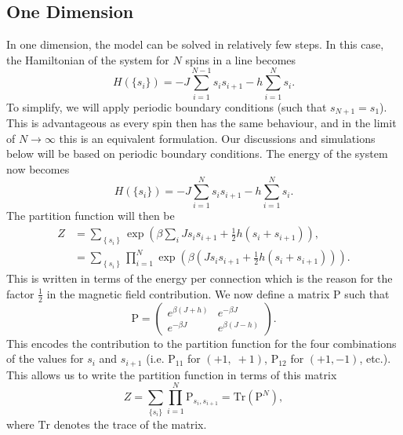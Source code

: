 \documentclass[11pt]{article}
\newcommand{\bmat}[1]{\bm{\mathrm{#1}}}
\begin{document}
	\subsection{One Dimension}
	
	In one dimension, the model can be solved in relatively few steps. In this case, the Hamiltonian of the system for $N$ spins in a line becomes
	\begin{equation}
		H(\{s_i\}) = -J \sum_{i=1}^{N-1} s_i s_{i+1} -h\sum_{i=1}^N s_i.
	\end{equation}
	To simplify, we will apply periodic boundary conditions (such that $s_{N+1} = s_1$). This is advantageous as every spin then has the same behaviour, and in the limit of $N \to \infty$ this is an equivalent formulation. Our discussions and simulations below will be based on periodic boundary conditions. The energy of the system now becomes
	\begin{equation} \label{eq:Energy1D}
		H(\{s_i\}) = -J \sum_{i=1}^{N} s_i s_{i+1} -h\sum_{i=1}^N s_i.
	\end{equation}
	The partition function will then be
	\begin{equation}
		\begin{split}
			Z &= \sum_{\left\{s_i\right\}} \exp{\left(\beta \sum_i Js_is_{i+1} + \frac12 h(s_i + s_{i+1})\right)}, \\
			&= \sum_{\left\{s_i\right\}} \prod_{i=1}^N \exp{\left(\beta \left(Js_is_{i+1} + \frac12 h(s_i + s_{i+1})\right)\right)}.
		\end{split}
	\end{equation}
	This is written in terms of the energy per connection which is the reason for the factor $\frac12$ in the magnetic field contribution. We now define a matrix $\bmat{P}$ such that
	\begin{equation} \label{eq:MatrixP}
		\bmat{P} = \begin{pmatrix}
			e^{\beta(J+h)} & e^{-\beta J} \\
			e^{-\beta J} & e^{\beta(J-h)}
		\end{pmatrix}.
	\end{equation}
	This encodes the contribution to the partition function for the four combinations of the values for $s_i$ and $s_{i+1}$ (i.e. $\mathrm{P}_{11}$ for $(+1,\;+1)$, $\mathrm{P}_{12}$ for $(+1, -1)$, etc.). This allows us to write the partition function in terms of this matrix
	\begin{equation} \label{eq:PartitionFunction1DGeneral}
		Z = \sum_{\{s_i\}} \prod_{i=1}^{N} \mathrm{P}_{s_i, s_{i+1}} = \mathrm{Tr}(\bmat{P}^N),
	\end{equation}
	where $\mathrm{Tr}$ denotes the trace of the matrix.
\end{document}
